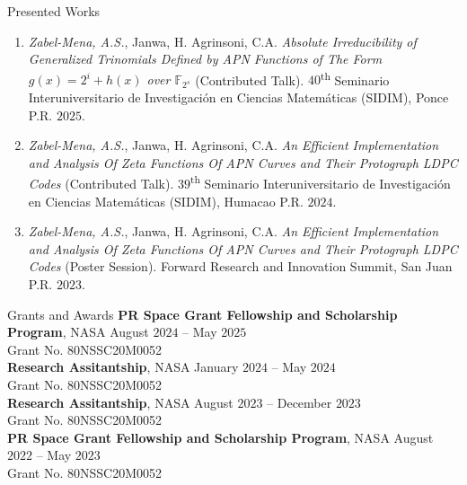 \documentclass{resume}
\begin{document}
\begin{rSection}{Presented Works}
  \begin{enumerate}
    \item \textit{Zabel-Mena, A.S.}, Janwa, H. Agrinsoni, C.A.
      \textit{Absolute Irreducibility of Generalized
        Trinomials Defined by APN Functions of The Form
      $g(x)=2^{i}+h(x)$ over $\mathbb{F}_{2^s}$} (Contributed Talk).
      $40$\textsuperscript{th} Seminario Interuniversitario de
      Investigaci\'on en Ciencias Matem\'aticas (SIDIM), Ponce P.R.
      $2025$.

    \item \textit{Zabel-Mena, A.S.}, Janwa, H. Agrinsoni, C.A.
      \textit{An Efficient Implementation and Analysis Of Zeta
      Functions Of APN Curves and Their Protograph LDPC Codes}
      (Contributed Talk). $39$\textsuperscript{th} Seminario
      Interuniversitario de Investigaci\'on en Ciencias Matem\'aticas
      (SIDIM), Humacao P.R. $2024$.

    \item \textit{Zabel-Mena, A.S.}, Janwa, H. Agrinsoni, C.A.
      \textit{An Efficient Implementation and Analysis Of Zeta
      Functions Of APN Curves and Their Protograph LDPC Codes}
      (Poster Session). Forward Research and Innovation Summit, San
      Juan P.R. $2023$.
  \end{enumerate}
\end{rSection}

\begin{rSection}{Grants and Awards}
  \textbf{PR Space Grant Fellowship and Scholarship Program}, NASA
  \hfill{August $2024$ -- May $2025$} \\
  Grant No. 80NSSC20M0052 \\

  \textbf{Research Assitantship}, NASA
  \hfill{January $2024$ -- May $2024$} \\
  Grant No. 80NSSC20M0052 \\

  \textbf{Research Assitantship}, NASA
  \hfill{August $2023$ -- December $2023$} \\
  Grant No. 80NSSC20M0052 \\

  \textbf{PR Space Grant Fellowship and Scholarship Program}, NASA
  \hfill{August $2022$ -- May $2023$} \\
  Grant No. 80NSSC20M0052 \\
\end{rSection}
\end{document}

